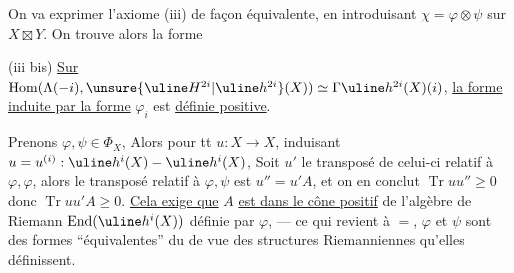 On va exprimer l'axiome (iii) de façon équivalente,
en introduisant $\chi=\varphi\otimes\psi$ sur $X\boxtimes Y$.
On trouve alors
la forme

(iii bis) \uline{Sur} 
$\operatorname{Hom}(\Lambda(-i),\unsure{\uline H^{2i}|\uline h^{2i}}(X))
\simeq\Gamma\uline h^{2i}(X)(i)$,
\uline{la forme induite par la forme} $\varphi_i$ est \uline{définie positive}.


Prenons $\varphi,\psi\in\Phi_X$,
Alors pour tt $u:X\longrightarrow X$, induisant
$u=u^{(i)}:\uline h^i(X)\mathbin{-}\uline h^i(X)$,
Soit $u'$ le transposé de celui-ci relatif à $\varphi,\varphi$,
alors le transposé relatif à $\varphi,\psi$ est $u''=u'A$,
et on en conclut $\operatorname{Tr}uu''\geq0$ donc $\operatorname{Tr}uu'A\geq0$.
\uline{Cela exige que} $A$ \uline{est dans le cône positif}
de l'algèbre  de Riemann
$\operatorname{End}(\uline h^i(X))$ définie par $\varphi$, --- ce qui
revient à $=$, $\varphi$ et $\psi$ sont des formes
``équivalentes'' du  de vue des structures
Riemanniennes qu'elles définissent.
